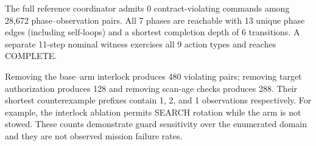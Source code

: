 The full reference coordinator admits 0 contract-violating commands among 28,672 phase--observation pairs. All 7 phases are reachable with 13 unique phase edges (including self-loops) and a shortest completion depth of 6 transitions. A separate 11-step nominal witness exercises all 9 action types and reaches COMPLETE.

Removing the base--arm interlock produces 480 violating pairs; removing target authorization produces 128 and removing scan-age checks produces 288. Their shortest counterexample prefixes contain 1, 2, and 1 observations respectively. For example, the interlock ablation permits SEARCH rotation while the arm is not stowed. These counts demonstrate guard sensitivity over the enumerated domain and they are not observed mission failure rates.
